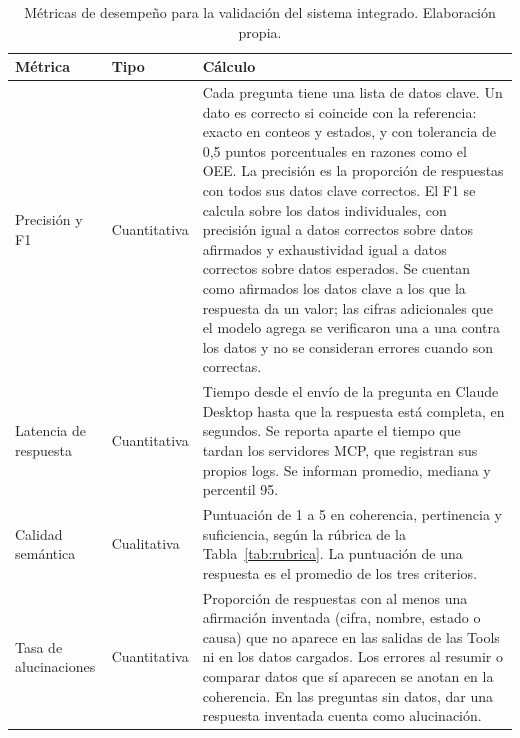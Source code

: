 \begin{table}[H]
\centering
\caption{Métricas de desempeño para la validación del sistema integrado. Elaboración propia.}
\label{tab:metricas_validacion}
\small
\renewcommand{\arraystretch}{1.3}
\begin{tabular}{p{2.8cm}p{2.4cm}p{8.8cm}}
\hline
\textbf{Métrica} & \textbf{Tipo} & \textbf{Cálculo} \\
\hline
Precisión y F1 & Cuantitativa & Cada pregunta tiene una lista de datos clave. Un dato es correcto si coincide con la referencia: exacto en conteos y estados, y con tolerancia de 0,5 puntos porcentuales en razones como el OEE. La precisión es la proporción de respuestas con todos sus datos clave correctos. El F1 se calcula sobre los datos individuales, con precisión igual a datos correctos sobre datos afirmados y exhaustividad igual a datos correctos sobre datos esperados. Se cuentan como afirmados los datos clave a los que la respuesta da un valor; las cifras adicionales que el modelo agrega se verificaron una a una contra los datos y no se consideran errores cuando son correctas. \\
Latencia de respuesta & Cuantitativa & Tiempo desde el envío de la pregunta en Claude Desktop hasta que la respuesta está completa, en segundos. Se reporta aparte el tiempo que tardan los servidores MCP, que registran sus propios logs. Se informan promedio, mediana y percentil 95. \\
Calidad semántica & Cualitativa & Puntuación de 1 a 5 en coherencia, pertinencia y suficiencia, según la rúbrica de la Tabla~\ref{tab:rubrica}. La puntuación de una respuesta es el promedio de los tres criterios. \\
Tasa de alucinaciones & Cuantitativa & Proporción de respuestas con al menos una afirmación inventada (cifra, nombre, estado o causa) que no aparece en las salidas de las Tools ni en los datos cargados. Los errores al resumir o comparar datos que sí aparecen se anotan en la coherencia. En las preguntas sin datos, dar una respuesta inventada cuenta como alucinación. \\
\hline
\end{tabular}
\end{table}

